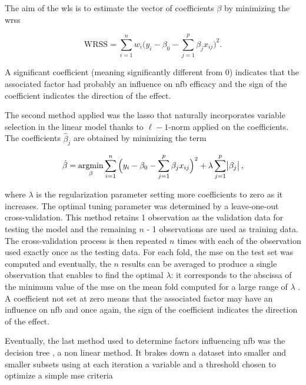\documentclass[12pt,a4paper,english]{article}
\DeclareMathOperator*{\argmin}{argmin}
\begin{document}
The aim of the \gls{wls} is to estimate the vector of coefficients $\beta$ by minimizing the \gls{wrss}

\begin{equation}
\label{eq:factors_WRSS}
\text{WRSS} = \sum_{i=1}^{n} w_i \Big(y_i - \beta_{0} - \sum_{j=1}^{p}\beta_{j}x_{ij}\Big)^2.
\end{equation}

A significant coefficient (meaning significantly different from 0) indicates that the associated factor had probably an influence on \gls{nfb} efficacy and the sign 
of the coefficient indicates the direction of the effect.

The second method applied was the \gls{lasso} that naturally incorporates variable selection 
in the linear model thanks to $\ell-1$-norm applied on the coefficients. The coefficients $\hat{\beta}_j$ are obtained by minimizing the term

\begin{equation}
\label{eq:factors_lasso-minimization}
\hat{\beta} = \argmin_\beta \sum_{i=1}^{n} \Big(y_i - \beta_{0} - \sum_{j=1}^{p}\beta_{j}x_{ij}\Big)^2 + \lambda \sum_{j=1}^{p}\abs{\beta_{j}},
\end{equation} 

where $\lambda$ is the regularization parameter setting more coefficients to zero as it increases. The optimal tuning parameter was determined 
by a leave-one-out cross-validation. This method retains 1 observation as the validation data for testing the model and the 
remaining $n$ - 1 observations are used as training data. The cross-validation process is then repeated $n$ times with each of the observation 
used exactly once as the testing data. For each fold, the \gls{mse} on the test set was computed and eventually, the $n$ results can 
be averaged to produce a single observation that enables to find the optimal $\lambda$: it corresponds to the abscissa of the minimum
value of the \gls{mse} on the mean fold computed for a large range of $\lambda$ \citep{James2013}. 
A coefficient not set at zero means that the associated factor may have an influence on \gls{nfb} and once again,
the sign of the coefficient indicates the direction of the effect.

Eventually, the last method used to determine factors influencing \gls{nfb} was the decision tree \citep{Quinlan1986}, a non linear method. It brakes down a dataset into smaller
and smaller subsets using at each iteration a variable and a threshold chosen to optimize a simple \gls{mse} criteria 
\end{document}
